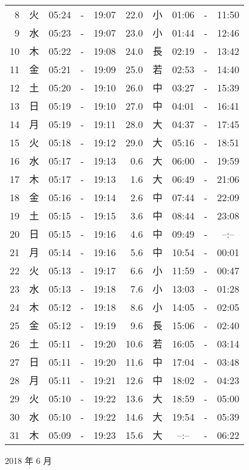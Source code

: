\documentclass[a4j,10pt]{jsarticle}
\begin{document}
\begin{center}
\begin{table}[ht]
\begin{center}
\begin{tabular}{|rc|ccc|rc|ccc|}
  8 & 火 & 05:24 &-& 19:07 & 22.0 & 小 & 01:06 &-& 11:50 \\
  9 & 水 & 05:23 &-& 19:07 & 23.0 & 小 & 01:44 &-& 12:46 \\
 10 & 木 & 05:22 &-& 19:08 & 24.0 & 長 & 02:19 &-& 13:42 \\
 11 & 金 & 05:21 &-& 19:09 & 25.0 & 若 & 02:53 &-& 14:40 \\
 12 & 土 & 05:20 &-& 19:10 & 26.0 & 中 & 03:27 &-& 15:39 \\
 13 & 日 & 05:19 &-& 19:10 & 27.0 & 中 & 04:01 &-& 16:41 \\
 14 & 月 & 05:19 &-& 19:11 & 28.0 & 大 & 04:37 &-& 17:45 \\
 15 & 火 & 05:18 &-& 19:12 & 29.0 & 大 & 05:16 &-& 18:51 \\
 16 & 水 & 05:17 &-& 19:13 &  0.6 & 大 & 06:00 &-& 19:59 \\
 17 & 木 & 05:17 &-& 19:13 &  1.6 & 大 & 06:49 &-& 21:06 \\
 18 & 金 & 05:16 &-& 19:14 &  2.6 & 中 & 07:44 &-& 22:09 \\
 19 & 土 & 05:15 &-& 19:15 &  3.6 & 中 & 08:44 &-& 23:08 \\
 20 & 日 & 05:15 &-& 19:16 &  4.6 & 中 & 09:49 &-&  --:--  \\
 21 & 月 & 05:14 &-& 19:16 &  5.6 & 中 & 10:54 &-& 00:01 \\
 22 & 火 & 05:13 &-& 19:17 &  6.6 & 小 & 11:59 &-& 00:47 \\
 23 & 水 & 05:13 &-& 19:18 &  7.6 & 小 & 13:03 &-& 01:28 \\
 24 & 木 & 05:12 &-& 19:18 &  8.6 & 小 & 14:05 &-& 02:05 \\
 25 & 金 & 05:12 &-& 19:19 &  9.6 & 長 & 15:06 &-& 02:40 \\
 26 & 土 & 05:11 &-& 19:20 & 10.6 & 若 & 16:05 &-& 03:14 \\
 27 & 日 & 05:11 &-& 19:20 & 11.6 & 中 & 17:04 &-& 03:48 \\
 28 & 月 & 05:11 &-& 19:21 & 12.6 & 中 & 18:02 &-& 04:23 \\
 29 & 火 & 05:10 &-& 19:22 & 13.6 & 大 & 18:59 &-& 05:00 \\
 30 & 水 & 05:10 &-& 19:22 & 14.6 & 大 & 19:54 &-& 05:39 \\
 31 & 木 & 05:09 &-& 19:23 & 15.6 & 大 &  --:--  &-& 06:22 \\
    \hline
    \end{tabular}
    \end{center}
\end{table}
\newpage
  {\large 2018 年  6 月}

\end{center}
\end{document}
